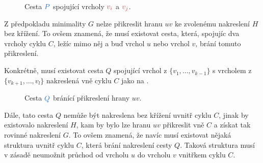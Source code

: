 \begin{enhproof}
\begin{figure}[H]
  \caption{Cesta $\clb{P}$ spojující vrcholy $\clr{v_i}$ a $\clr{v_j}$.}
  \label{fig:cesta-mezi-vi-a-vj}
 \end{figure}

 Z předpokladu minimality $G$ nelze přikreslit hranu $uv$ ke zvolenému
 nakreslení $H$ bez křížení. To ovšem znamená, že musí existovat cesta, která,
 spojujíc dva vrcholy cyklu $C$, ležíc mimo něj a  buď vrchol $u$
 nebo vrchol $v$, brání tomuto přikreslení.

 Konkrétně, musí existovat cesta $Q$ spojující vrchol z $\{v_1,\ldots,v_{k-1}\}$
 s vrcholem z $\{v_{k+1},\ldots,v_l\}$ nakreslená vně cyklu $C$ jako na
 .

 \begin{figure}[H]
  \centering

  \caption{Cesta $\clb{Q}$ bránící přikreslení hrany $uv$.}
  \label{fig:cesta-vne-cyklu}
 \end{figure}

 Dále, tato cesta $Q$ nemůže být nakreslena bez křížení uvnitř cyklu $C$, jinak
 by existovalo nakreslení $H$, kam by bylo lze hranu $uv$ přikreslit vně $C$ a
 získat tak rovinné nakreslení $G$. To ovšem znamená, že navíc musí existovat
 nějaká struktura uvnitř cyklu $C$, která brání nakreslení cesty $Q$. Taková
 struktura musí v zásadě neumožnit průchod od vrcholu $u$ do vrcholu $v$
 vnitřkem cyklu $C$.


\end{enhproof}
